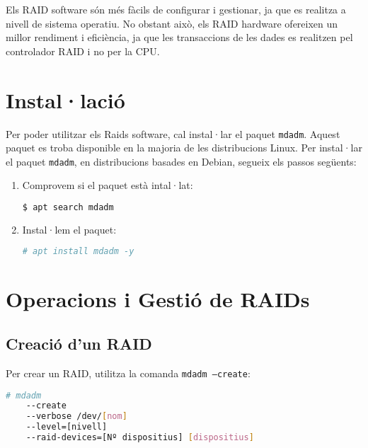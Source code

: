 \begin{info}
Els RAID software són més fàcils de configurar i gestionar, ja que es realitza a nivell de sistema operatiu. No obstant això, els RAID hardware ofereixen un millor rendiment i eficiència, ja que les transaccions de les dades es realitzen pel controlador RAID i no per la CPU.
\end{info}



\section{Instal·lació}\label{installacio-raids}

Per poder utilitzar els Raids software, cal instal·lar el paquet \texttt{mdadm}. Aquest paquet es troba disponible en la majoria de les distribucions Linux. Per instal·lar el paquet \texttt{mdadm}, en distribucions basades en Debian, segueix els passos següents:

\begin{enumerate}
\item Comprovem si el paquet està intal·lat:
\begin{lstlisting}[language=bash, numbers=none]
$ apt search mdadm
\end{lstlisting}

\item Instal·lem el paquet:
\begin{lstlisting}[language=bash, numbers=none, commentstyle=\color{black}]
# apt install mdadm -y
\end{lstlisting}
\end{enumerate}

\section{Operacions i Gestió de RAIDs}\label{operacions-i-gestió-de-raids}

\subsection{Creació d'un RAID}\label{creació-dun-raid}

Per crear un RAID, utilitza la comanda \texttt{mdadm --create}:

\begin{lstlisting}[language=bash, numbers=none, commentstyle=\color{black}]
# mdadm 
    --create  
    --verbose /dev/[nom] 
    --level=[nivell] 
    --raid-devices=[Nº dispositius] [dispositius] 
\end{lstlisting}

